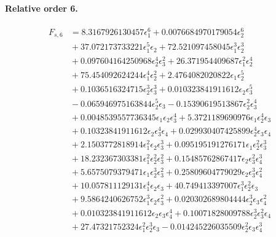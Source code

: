\documentclass[10pt]{article}
\begin{document}
\paragraph{Relative order 6.}
\begin{align*}
F_{s,6} &= 8.3167926130457 \epsilon_{1}^{6} + 0.0076684970179054 \epsilon_{2}^{6} \\
&{}  + 37.072173733221 \epsilon_{1}^{5} \epsilon_{2} + 72.521097458045 \epsilon_{1}^{3} \epsilon_{2}^{3} \\
&{}  + 0.097604164250968 \epsilon_{2}^{4} \epsilon_{3}^{2} + 26.371954409687 \epsilon_{1}^{2} \epsilon_{2}^{4} \\
&{}  + 75.454092624244 \epsilon_{1}^{4} \epsilon_{2}^{2} + 2.4764082020822 \epsilon_{1} \epsilon_{2}^{5} \\
&{}  + 0.1036516324715 \epsilon_{2}^{3} \epsilon_{3}^{3} + 0.010323841911612 \epsilon_{2} \epsilon_{3}^{5} \\
&{}  - 0.065946975163844 \epsilon_{2}^{5} \epsilon_{3} - 0.15390619513867 \epsilon_{2}^{2} \epsilon_{3}^{4} \\
&{}  + 0.0048539557736345 \epsilon_{1} \epsilon_{2} \epsilon_{3}^{4} + 5.3721189690976 \epsilon_{1} \epsilon_{2}^{4} \epsilon_{3} \\
&{}  + 0.10323841911612 \epsilon_{2} \epsilon_{3}^{4} \epsilon_{4} + 0.029930407425899 \epsilon_{2}^{4} \epsilon_{3} \epsilon_{4} \\
&{}  + 2.1503772818914 \epsilon_{1}^{2} \epsilon_{2} \epsilon_{3}^{3} + 0.095195191276171 \epsilon_{1} \epsilon_{2}^{2} \epsilon_{3}^{3} \\
&{}  + 18.232367303381 \epsilon_{1}^{2} \epsilon_{2}^{2} \epsilon_{3}^{2} + 0.15485762867417 \epsilon_{2} \epsilon_{3}^{2} \epsilon_{4}^{3} \\
&{}  + 5.6575079379471 \epsilon_{1} \epsilon_{2}^{3} \epsilon_{3}^{2} + 0.25809604779029 \epsilon_{2} \epsilon_{3}^{3} \epsilon_{4}^{2} \\
&{}  + 10.057811129131 \epsilon_{1}^{4} \epsilon_{2} \epsilon_{3} + 40.749413397007 \epsilon_{1}^{3} \epsilon_{2}^{2} \epsilon_{3} \\
&{}  + 9.5864240626752 \epsilon_{1}^{3} \epsilon_{2} \epsilon_{3}^{2} + 0.020302689804444 \epsilon_{2}^{3} \epsilon_{3} \epsilon_{4}^{2} \\
&{}  + 0.010323841911612 \epsilon_{2} \epsilon_{3} \epsilon_{4}^{4} + 0.10071828009788 \epsilon_{2}^{3} \epsilon_{3}^{2} \epsilon_{4} \\
&{}  + 27.47321752324 \epsilon_{1}^{2} \epsilon_{2}^{3} \epsilon_{3} - 0.014245226035509 \epsilon_{2}^{2} \epsilon_{3} \epsilon_{4}^{3} \\

\end{align*}
\end{document}
